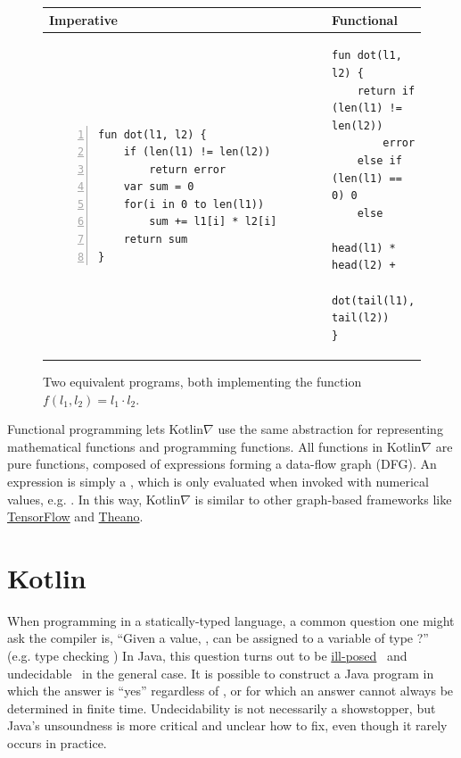 \begin{figure}[t]
    \centering
    \begin{tabular}{|l|l|}
        \hline
        Imperative & Functional \\
        \hline
{\begin{lstlisting}[style=barelisting, linewidth=5.7cm, numbers=left]
fun dot(l1, l2) {
    if (len(l1) != len(l2))
        return error
    var sum = 0
    for(i in 0 to len(l1))
        sum += l1[i] * l2[i]
    return sum
}
\end{lstlisting}}
        &
{\begin{lstlisting}[style=barelisting, linewidth=6.5cm, numbers=none]
fun dot(l1, l2) {
    return if (len(l1) != len(l2))
        error
    else if (len(l1) == 0) 0
    else
        head(l1) * head(l2) +
        dot(tail(l1), tail(l2))
}
\end{lstlisting}}
        \\
        \hline
    \end{tabular}
    \caption{Two equivalent programs, both implementing the function $f(l_1, l_2) = l_1 \cdot l_2$.}
    \label{fig:fp_vs_ip}
\end{figure}

Functional programming lets Kotlin$\nabla$ use the same abstraction for representing mathematical functions and programming functions. All functions in Kotlin$\nabla$ are pure functions, composed of expressions forming a data-flow graph (DFG). An expression is simply a , which is only evaluated when invoked with numerical values, e.g. . In this way, Kotlin$\nabla$ is similar to other graph-based frameworks like \href{https://www.tensorflow.org/guide/graphs}{TensorFlow} and \href{http://deeplearning.net/software/theano/extending/graphstructures.html}{Theano}.

\section{Kotlin}\label{sec:kotlin}

When programming in a statically-typed language, a common question one might ask the compiler is, ``Given a value, , can  be assigned to a variable of type ?'' (e.g. type checking ) In Java, this question turns out to be \href{http://io.livecode.ch/learn/namin/unsound}{ill-posed}~\citep{amin2016java} and undecidable~\citep{grigore2017java} in the general case. It is possible to construct a Java program in which the answer is ``yes'' regardless of , or for which an answer cannot always be determined in finite time. Undecidability is not necessarily a showstopper, but Java's unsoundness is more critical and unclear how to fix, even though it rarely occurs in practice.

